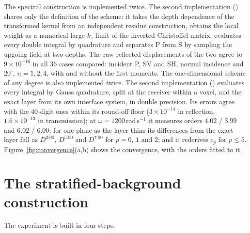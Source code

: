 \documentclass[preprint,review,12pt]{elsarticle}
\begin{document}
The spectral construction is implemented twice. The second implementation
() shares only the definition of the scheme: it takes
the depth dependence of the transformed kernel from an independent residue construction, obtains
the local weight as a numerical large-$k_z$ limit of the inverted Christoffel matrix, evaluates every
double integral by quadrature and separates P from S by sampling the upgoing field at two depths.
The raw reflected displacements of the two agree to $9\times10^{-16}$ in all $36$ cases compared:
incident P, SV and SH, normal incidence and $20^\circ$, $n=1,2,4$, with and without the first moments.
The one-dimensional scheme of any degree is also implemented twice. The second implementation
() evaluates every integral by Gauss quadrature, split
at the receiver within a voxel, and the exact layer from its own interface system, in double
precision. Its errors agree with the 40-digit ones within its round-off floor ($3\times10^{-14}$ in
reflection, $1.6\times10^{-13}$ in transmission); at $\omega=1200$\,rad\,s$^{-1}$ it measures orders
$4.02$ / $3.99$ and $6.02$ / $6.00$; for one plane as the layer thins its differences from the exact
layer fall as $D^{3.00}$, $D^{5.00}$ and $D^{7.00}$ for $p=0$, $1$ and $2$; and it rederives $c_p$ for
$p\le5$. Figure~\ref{fig:convergence}(a,b) shows the convergence, with the orders fitted to it.

\FloatBarrier

\section{The stratified-background construction}\label{app:strat}

The experiment is built in four steps.
\end{document}
